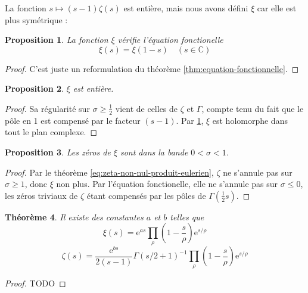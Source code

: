 \documentclass[french]{report}
\newtheorem{theorem}{Théorème}[section]
\newtheorem{proposition}[theorem]{Proposition}
\begin{document}
La fonction $s\mapsto(s-1)\zeta(s)$ est entière, mais nous avons défini $\xi$ car elle est plus symétrique :

\begin{proposition}\label{prop:xi-equation-fonctionnelle}
  La fonction $\xi$ vérifie l'équation fonctionelle
  \[ \xi(s) = \xi(1-s)\quad (s\in\mathbb{C}) \]
\end{proposition}

\begin{proof}
  C'est juste un reformulation du théorème \ref{thm:equation-fonctionnelle}.
\end{proof}

\begin{proposition}
  $\xi$ est entière.
\end{proposition}

\begin{proof}
  Sa régularité sur $\sigma\geq\frac{1}{2}$ vient de celles de $\zeta$ et $\Gamma$, compte tenu du fait que le pôle en 1 est compensé par le facteur $(s-1)$. Par \ref{prop:xi-equation-fonctionnelle}, $\xi$ est holomorphe dans tout le plan complexe.
\end{proof}

\begin{proposition}
  Les zéros de $\xi$ sont dans la bande $0<\sigma<1$.
\end{proposition}

\begin{proof}
  Par le théorème \ref{eq:zeta-non-nul-produit-eulerien}, $\zeta$ ne s'annule pas sur $\sigma\geq1$, donc $\xi$ non plus. Par l'équation fonctionelle, elle ne s'annule pas sur $\sigma\leq0$, les zéros triviaux de $\zeta$ étant compensés par les pôles de $\Gamma(\frac{1}{2}s)$.
\end{proof}

\begin{theorem}\label{thm:produit-hadamard}
  Il existe des constantes $a$ et $b$ telles que
  \[ \xi(s)=\mathrm{e}^{as}\prod_{\rho}\left(1-\frac{s}{\rho}\right)\mathrm{e}^{s/\rho} \]
  \[ \zeta(s)=\frac{\mathrm{e}^{bs}}{2(s-1)}\Gamma(s/2+1)^{-1}\prod_{\rho}\left(1-\frac{s}{\rho}\right)\mathrm{e}^{s/\rho} \]
\end{theorem}

\begin{proof}
  TODO
\end{proof}

\end{document}
